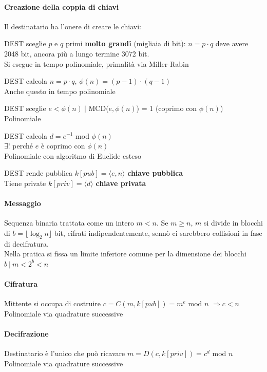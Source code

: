 \documentclass[10pt]{book}
\begin{document}
\paragraph{Creazione della coppia di chiavi} Il destinatario ha l'onere di creare le chiavi:
\begin{list}{}{}
	\item DEST sceglie $p$ e $q$ primi \textbf{molto grandi} (migliaia di bit): $n = p\cdot q$ deve avere 2048 bit, ancora più a lungo termine 3072 bit.\\
	Si esegue in tempo polinomiale, primalità via Miller-Rabin
	\item DEST calcola $n = p\cdot q$, $\phi(n) = (p-1)\cdot(q-1)$\\
	Anche questo in tempo polinomiale
	\item DEST sceglie $e < \phi(n)\:|$ MCD($e, \phi(n)$) = 1 (coprimo con $\phi(n)$)\\
	Polinomiale
	\item DEST calcola $d = e^{-1}$ mod $\phi(n)$\\
	$\exists!$ perché $e$ è coprimo con $\phi(n)$\\
	Polinomiale con algoritmo di Euclide esteso
	\item DEST rende pubblica $k[pub]=\langle e, n\rangle$ \textbf{chiave pubblica}\\
	Tiene private $k[priv]=\langle d\rangle$ \textbf{chiave privata}
\end{list}
\paragraph{Messaggio} Sequenza binaria trattata come un intero $m < n$. Se $m \geq n$, $m$ si divide in blocchi di $b = \lfloor\log_2 n\rfloor$ bit, cifrati indipendentemente, sennò ci sarebbero collisioni in fase di decifratura.\\
Nella pratica si fissa un limite inferiore comune per la dimensione dei blocchi $b\:|\:m<2^b<n$
\paragraph{Cifratura} Mittente si occupa di costruire $c = C(m, k[pub]) = m^e$ mod $n$ $\Rightarrow c<n$\\
Polinomiale via quadrature successive
\paragraph{Decifrazione} Destinatario è l'unico che può ricavare $m = D(c, k[priv]) = c^d$ mod $n$\\
Polinomiale via quadrature successive
\end{document}
